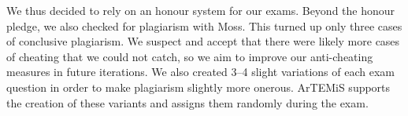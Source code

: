 We thus decided to rely on an honour system for our exams.
Beyond the honour pledge,
we also checked for plagiarism with Moss.
This turned up only three cases of conclusive plagiarism.
We suspect and accept that there were likely more cases of cheating that we could not catch,
so we aim to improve our anti-cheating measures in future iterations.
We also created 3--4 slight variations of each exam question
in order to make plagiarism slightly more onerous. ArTEMiS supports the creation of these variants and assigns them randomly during the exam.

